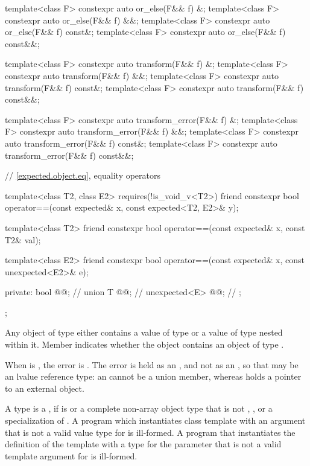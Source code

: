 \begin{codeblock}
{{    template<class F> constexpr auto or_else(F&& f) &;
    template<class F> constexpr auto or_else(F&& f) &&;
    template<class F> constexpr auto or_else(F&& f) const&;
    template<class F> constexpr auto or_else(F&& f) const&&;

    template<class F> constexpr auto transform(F&& f) &;
    template<class F> constexpr auto transform(F&& f) &&;
    template<class F> constexpr auto transform(F&& f) const&;
    template<class F> constexpr auto transform(F&& f) const&&;

    template<class F> constexpr auto transform_error(F&& f) &;
    template<class F> constexpr auto transform_error(F&& f) &&;
    template<class F> constexpr auto transform_error(F&& f) const&;
    template<class F> constexpr auto transform_error(F&& f) const&&;

    // \ref{expected.object.eq}, equality operators

    template<class T2, class E2>
      requires(!is_void_v<T2>)
    friend constexpr bool operator==(const expected& x, const expected<T2, E2>& y);

    template<class T2>
    friend constexpr bool operator==(const expected& x, const T2& val);

    template<class E2>
    friend constexpr bool operator==(const expected& x, const unexpected<E2>& e);

  private:
    bool @@; // \expos
    union {
      T @@;              // \expos
      unexpected<E> @@; // \expos
    };
  };
}
\end{codeblock}

\pnum
Any object of type  either contains a value of type  or a value of type  nested within it. Member  indicates whether the  object contains an object of type .

\pnum
When  is , the error is . The error is held as an , and not as an , so that  may be an lvalue reference type: an  cannot be a union member, whereas  holds a pointer to an external object.

\pnum
A type  is a , if  is  or a complete non-array object type that is not , , or a specialization of . A program which instantiates class template  with an argument  that is not a valid value type for  is ill-formed. A program that instantiates the definition of the template  with a type for the  parameter that is not a valid template argument for  is ill-formed.

